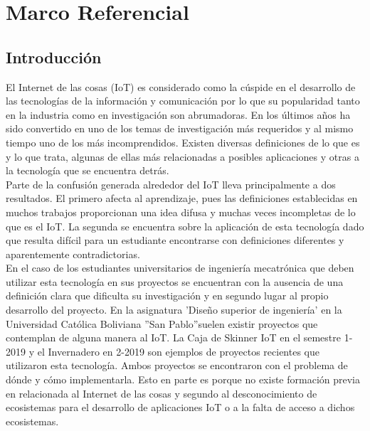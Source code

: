 \chapter{Marco Referencial}
\section{Introducción}

El Internet de las cosas (IoT) es considerado como la cúspide en el desarrollo de las tecnologías de la
información y comunicación por lo que su popularidad tanto en la industria como en investigación
son abrumadoras. En los últimos años ha sido convertido en uno de los temas de investigación
más requeridos y al mismo tiempo uno de los más incomprendidos. Existen diversas definiciones
de lo que es y lo que trata, algunas de ellas más relacionadas a posibles aplicaciones y otras a la
tecnología que se encuentra detrás\cite{atzori2017understanding}.\\

Parte de la confusión generada alrededor del IoT lleva principalmente a dos resultados. El primero afecta al
aprendizaje, pues las definiciones establecidas en muchos trabajos proporcionan una idea difusa
y muchas veces incompletas de lo que es el IoT. La segunda se encuentra sobre la aplicación de
esta tecnología dado que resulta difícil para un estudiante encontrarse con definiciones diferentes
y aparentemente contradictorias.\\

En el caso de los estudiantes universitarios de ingeniería mecatrónica que deben utilizar esta
tecnología en sus proyectos se encuentran con la ausencia de una definición clara que dificulta
su investigación y en segundo lugar al propio desarrollo del proyecto. En la asignatura ’Diseño
superior de ingeniería’ en la Universidad Católica Boliviana ”San Pablo”suelen existir proyectos
que contemplan de alguna manera al IoT. La Caja de Skinner IoT en el semestre 1-2019 y
el Invernadero en 2-2019 son ejemplos de proyectos recientes que utilizaron esta tecnología.
Ambos proyectos se encontraron con el problema de dónde y cómo implementarla. Esto en
parte es porque no existe formación previa en relacionada al Internet de las cosas y segundo al
desconocimiento de ecosistemas para el desarrollo de aplicaciones IoT o a la falta de acceso a
dichos ecosistemas.\\


